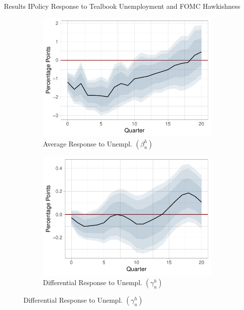 \documentclass[11pt,pdf,aspectratio=129]{beamer}
\begin{document}
\begin{frame}{Results I}{Policy Response to Tealbook Unemployment and FOMC Hawkishness}

    \begin{figure}[!htbp]\centering
        \label{fig:LP}
        \begin{subfigure}[b]{0.49\textwidth}
            \centering
            \caption{Average Response to Unempl. $\left(\beta_u^h\right)$}
            \label{fig:average_unemployment}
            \includegraphics[width=\linewidth]{average_unemployment_longer.pdf}
        \end{subfigure}
        \hfill
        \begin{subfigure}[b]{0.49\textwidth}
            \centering
            \caption{Differential Response to Unempl. $\left(\gamma_u^h\right)$}
            \label{fig:differential_unemployment}
            \includegraphics[width=\linewidth]{differential_unemployment_longer.pdf}

\end{subfigure}
\end{figure}
\end{frame}
\end{document}
